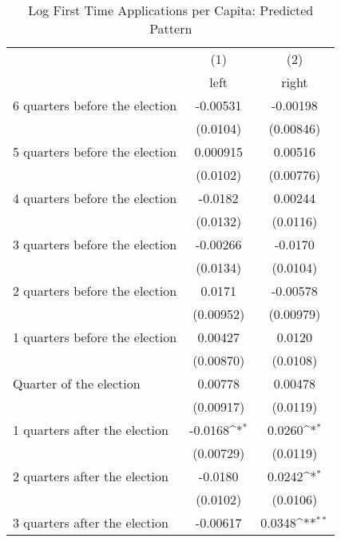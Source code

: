 \begin{table}[htbp]\centering
\def\sym#1{\ifmmode^{#1}\else\(^{#1}\)\fi}
\caption{Log First Time Applications per Capita: Predicted Pattern}
\begin{tabular}{l*{2}{c}}
\hline\hline
                    &\multicolumn{1}{c}{(1)}&\multicolumn{1}{c}{(2)}\\
                    &\multicolumn{1}{c}{left}&\multicolumn{1}{c}{right}\\
\hline
 6 quarters before the election&    -0.00531         &    -0.00198         \\
                    &    (0.0104)         &   (0.00846)         \\
[1em]
 5 quarters before the election&    0.000915         &     0.00516         \\
                    &    (0.0102)         &   (0.00776)         \\
[1em]
 4 quarters before the election&     -0.0182         &     0.00244         \\
                    &    (0.0132)         &    (0.0116)         \\
[1em]
 3 quarters before the election&    -0.00266         &     -0.0170         \\
                    &    (0.0134)         &    (0.0104)         \\
[1em]
 2 quarters before the election&      0.0171         &    -0.00578         \\
                    &   (0.00952)         &   (0.00979)         \\
[1em]
 1 quarters before the election&     0.00427         &      0.0120         \\
                    &   (0.00870)         &    (0.0108)         \\
[1em]
Quarter of the election&     0.00778         &     0.00478         \\
                    &   (0.00917)         &    (0.0119)         \\
[1em]
 1 quarters after the election&     -0.0168\sym{*}  &      0.0260\sym{*}  \\
                    &   (0.00729)         &    (0.0119)         \\
[1em]
 2 quarters after the election&     -0.0180         &      0.0242\sym{*}  \\
                    &    (0.0102)         &    (0.0106)         \\
[1em]
 3 quarters after the election&    -0.00617         &      0.0348\sym{**} \\

\end{tabular}
\end{table}
